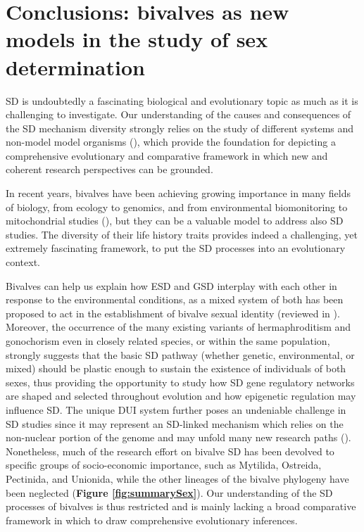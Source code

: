 \documentclass[../main.tex]{subfiles}
\begin{document}
\section{Conclusions: bivalves as new models in the study of sex determination}
SD is undoubtedly a fascinating biological and evolutionary topic as much as it is challenging to investigate. Our understanding of the causes and consequences of the SD mechanism diversity strongly relies on the study of different systems and non-model model organisms (\textbf{\cite{bachtrog2014sex,milani2020faraway}}), which provide the foundation for depicting a comprehensive evolutionary and comparative framework in which new and coherent research perspectives can be grounded.

In recent years, bivalves have been achieving growing importance in many fields of biology, from ecology to genomics, and from environmental biomonitoring to mitochondrial studies (\textbf{\cite{milani2020faraway,ghiselli2021bivalve}}), but they can be a valuable model to address also SD studies. The diversity of their life history traits provides indeed a challenging, yet extremely fascinating framework, to put the SD processes into an evolutionary context.

Bivalves can help us explain how ESD and GSD interplay with each other in response to the environmental conditions, as a mixed system of both has been proposed to act in the establishment of bivalve sexual identity (reviewed in \textbf{\cite{breton2018sex}}). Moreover, the occurrence of the many existing variants of hermaphroditism and gonochorism even in closely related species, or within the same population, strongly suggests that the basic SD pathway (whether genetic, environmental, or mixed) should be plastic enough to sustain the existence of individuals of both sexes, thus providing the opportunity to study how SD gene regulatory networks are shaped and selected throughout evolution and how epigenetic regulation may influence SD. The unique DUI system further poses an undeniable challenge in SD studies since it may represent an SD-linked mechanism which relies on the non-nuclear portion of the genome and may unfold many new research paths (\textbf{\cite{milani2020faraway,ghiselli2021bivalve}}). Nonetheless, much of the research effort on bivalve SD has been devolved to specific groups of socio-economic importance, such as Mytilida, Ostreida, Pectinida, and Unionida, while the other lineages of the bivalve phylogeny have been neglected (\textbf{Figure \ref{fig:summarySex}}). Our understanding of the SD processes of bivalves is thus restricted and is mainly lacking a broad comparative framework in which to draw comprehensive evolutionary inferences. 
\end{document}
